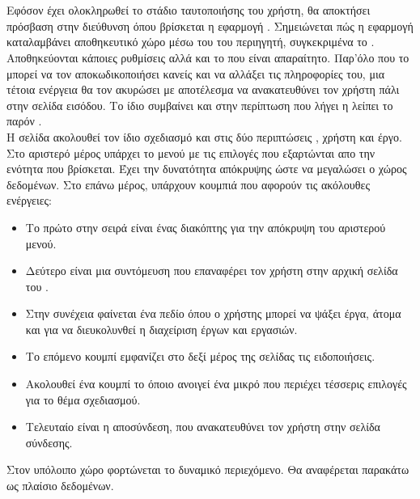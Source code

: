 \section{}
\pSpace Εφόσον έχει ολοκληρωθεί το στάδιο ταυτοποιήσης του χρήστη, θα αποκτήσει πρόσβαση στην διεύθυνση  όπου βρίσκεται η εφαρμογή . Σημειώνεται πώς η εφαρμογή καταλαμβάνει αποθηκευτικό χώρο μέσω του  του περιηγητή, συγκεκριμένα το . Αποθηκεύονται κάποιες ρυθμίσεις αλλά και το  που είναι απαραίτητο. Παρ'όλο που το  μπορεί να τον αποκωδικοποιήσει κανείς και να αλλάξει τις πληροφορίες του, μια τέτοια ενέργεια θα τον ακυρώσει με αποτέλεσμα να ανακατευθύνει τον χρήστη πάλι στην σελίδα εισόδου. Το ίδιο συμβαίνει και στην περίπτωση που λήγει η λείπει το παρόν .\\
\pSpace Η σελίδα ακολουθεί τον ίδιο σχεδιασμό και στις δύο περιπτώσεις , χρήστη και έργο. Στο αριστερό μέρος υπάρχει το μενού με τις επιλογές που εξαρτώνται απο την ενότητα που βρίσκεται. Έχει την δυνατότητα απόκρυψης ώστε να μεγαλώσει ο χώρος δεδομένων. Στο επάνω μέρος, υπάρχουν κουμπιά που αφορούν τις ακόλουθες ενέργειες:\\
\begin{itemize}
	\item Το πρώτο στην σειρά είναι ένας διακόπτης για την απόκρυψη του αριστερού μενού.
	\item Δεύτερο είναι μια συντόμευση που επαναφέρει τον χρήστη στην αρχική σελίδα του .
	\item Στην συνέχεια φαίνεται ένα πεδίο  όπου ο χρήστης μπορεί να ψάξει έργα, άτομα και  για να διευκολυνθεί η διαχείριση έργων και εργασιών.
	\item Το επόμενο κουμπί εμφανίζει στο δεξί μέρος της σελίδας τις ειδοποιήσεις.
	\item Ακολουθεί ένα κουμπί το όποιο ανοιγεί ένα μικρό  που περιέχει τέσσερις επιλογές για το θέμα σχεδιασμού.
	\item Τελευταίο είναι η αποσύνδεση, που ανακατευθύνει τον χρήστη στην σελίδα σύνδεσης.
\end{itemize}
\pSpace Στον υπόλοιπο χώρο φορτώνεται το δυναμικό περιεχόμενο. Θα αναφέρεται παρακάτω ως πλαίσιο δεδομένων.

